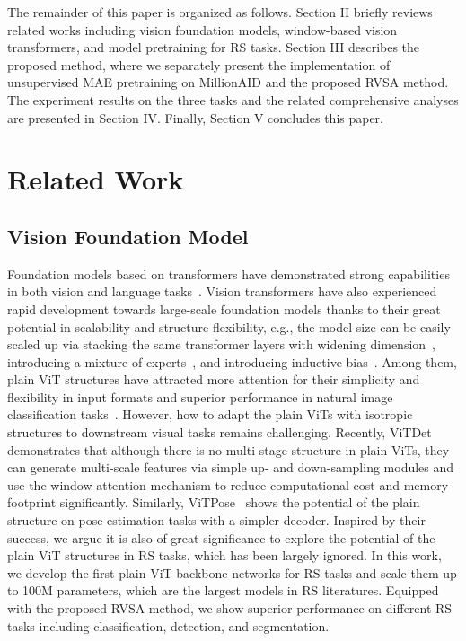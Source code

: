 \documentclass[10pt, journal,twoside]{IEEEtran}
\begin{document}
The remainder of this paper is organized as follows. Section II briefly reviews related works including vision foundation models, window-based vision transformers, and model pretraining for RS tasks. Section III describes the proposed method, where we separately present the implementation of unsupervised MAE pretraining on MillionAID and the proposed RVSA method. The experiment results on the three tasks and the related comprehensive analyses are presented in Section IV. Finally, Section V concludes this paper.


\section{Related Work}
\subsection{Vision Foundation Model}
Foundation models based on transformers have demonstrated strong capabilities in both vision and language tasks~\cite{bert,switch_transformer}. Vision transformers have also experienced rapid development towards large-scale foundation models thanks to their great potential in scalability and structure flexibility, e.g., the model size can be easily scaled up via stacking the same transformer layers with widening dimension~\cite{scale_vit}, introducing a mixture of experts~\cite{vmoe}, and introducing inductive bias~\cite{coatnet,vitae_v2,swint_v2}. Among them, plain ViT structures have attracted more attention for their simplicity and flexibility in input formats and superior performance in natural image classification tasks~\cite{yu2022coca}. However, how to adapt the plain ViTs with isotropic structures to downstream visual tasks remains challenging. Recently, ViTDet~\cite{vitdet} demonstrates that although there is no multi-stage structure in plain ViTs, they can generate multi-scale features via simple up- and down-sampling modules and use the window-attention mechanism to reduce computational cost and memory footprint significantly. Similarly, ViTPose~\cite{vitpose} shows the potential of the plain structure on pose estimation tasks with a simpler decoder. Inspired by their success, we argue it is also of great significance to explore the potential of the plain ViT structures in RS tasks, which has been largely ignored. In this work, we develop the first plain ViT backbone networks for RS tasks and scale them up to 100M parameters, which are the largest models in RS literatures. Equipped with the proposed RVSA method, we show superior performance on different RS tasks including classification, detection, and segmentation.
\end{document}
